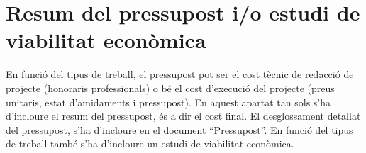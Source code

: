 \chapter{Resum del pressupost i/o estudi de viabilitat econòmica}
En funció del tipus de treball, el pressupost pot ser el cost tècnic de redacció de projecte (honoraris professionals) o bé el cost d’execució del projecte (preus unitaris, estat d’amidaments i pressupost).
En aquest apartat tan sols s’ha d’incloure el resum del pressupost, és a dir el cost final. El desglossament detallat del pressupost, s’ha d’incloure en el document “Pressupost”.
En funció del tipus de treball també s’ha d’incloure un estudi de viabilitat econòmica.
